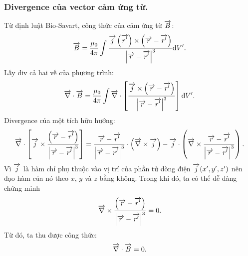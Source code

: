 \begin{appendices}
\subsubsection{Divergence của vector cảm ứng từ.}
Từ định luật Bio-Savart, công thức của cảm ứng từ $\overrightarrow{B}$:
$$\overrightarrow{B}=\dfrac{\mu_0}{4\pi}\int\dfrac{\overrightarrow{j}\left(\overrightarrow{r'}\right)\times\left(\overrightarrow{r}-\overrightarrow{r'}\right)}{\left|\overrightarrow{r}-\overrightarrow{r'}\right|^3}\mathrm{d} V'.$$
Lấy div cả hai vế của phương trình:
\begin{align*}
    \overrightarrow{\nabla}\cdot\overrightarrow{B}=\dfrac{\mu_0}{4\pi}\int\overrightarrow{\nabla}\cdot\left[\dfrac{\overrightarrow{j}\times\left(\overrightarrow{r}-\overrightarrow{r'}\right)}{\left|\overrightarrow{r}-\overrightarrow{r'}\right|^3}\right]\mathrm{d} V'.
\end{align*}
    Divergence của một tích hữu hướng:
    $$\overrightarrow{\nabla}\cdot\left[\overrightarrow{j}\times\dfrac{\left(\overrightarrow{r}-\overrightarrow{r'}\right)}{\left|\overrightarrow{r}-\overrightarrow{r'}\right|^3}\right]=\dfrac{\overrightarrow{r}-\overrightarrow{r'}}{\left|\overrightarrow{r}-\overrightarrow{r'}\right|^3}
    \cdot\left(\overrightarrow{\nabla}\times\overrightarrow{j}\right)-\overrightarrow{j}\cdot\left(\overrightarrow{\nabla}\times\dfrac{\overrightarrow{r}-\overrightarrow{r'}}{\left|\overrightarrow{r}-\overrightarrow{r'}\right|^3}\right).$$
    Vì $\overrightarrow{j}$ là hàm chỉ phụ thuộc vào vị trí của phần tử dòng điện $\overrightarrow{j}(x',y',z')$ nên đạo hàm của nó theo $x$, $y$ và $z$ bằng không. Trong khi đó, ta có thể dễ dàng chứng minh $$\overrightarrow{\nabla}\times\dfrac{\left(\overrightarrow{r}-\overrightarrow{r'}\right)}{\left|\overrightarrow{r}-\overrightarrow{r'}\right|^3}=0.$$
    Từ đó, ta thu được công thức:
    $$\overrightarrow{\nabla}\cdot\overrightarrow{B}=0.$$

\end{appendices}
